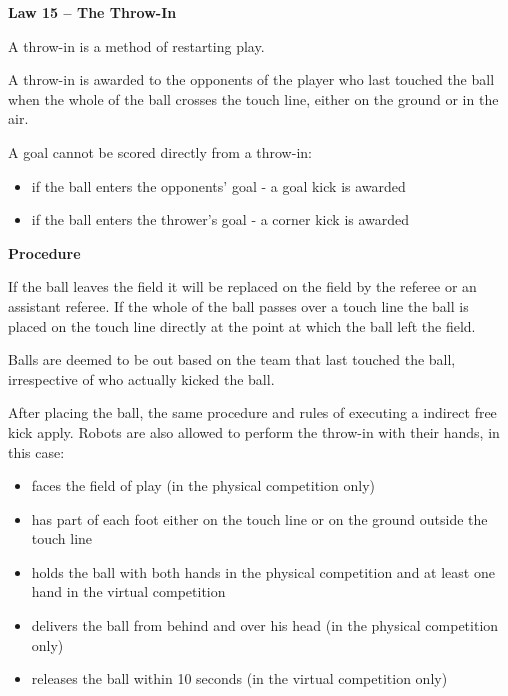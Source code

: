 \clearpage
\sffamily
{\bfseries
\textcolor[rgb]{0.4,0.4,0.4}{Law 15 -- The Throw-In} }
{}


\bigskip

A throw-in is a method of restarting play.

\bigskip

A throw-in is awarded to the opponents of the player who last touched the ball when the whole of the ball crosses the touch line, either on the ground or in the air.


\bigskip

A goal cannot be scored directly from a throw-in:
\begin{itemize}
\item if the ball enters the opponents' goal - a goal kick is awarded
\item if the ball enters the thrower's goal - a corner kick is awarded
\end{itemize}

\bigskip

{\bfseries Procedure }

\headlinebox 

If the ball leaves the field it will be replaced on the field by the referee or
an assistant referee.
If the whole of the ball passes over a touch line the ball is placed on the
touch line directly at the point at which the ball left the field.

\bigskip

Balls are deemed to be out based on the team that last touched the ball,
irrespective of who actually kicked the ball.

\bigskip

After placing the ball, the same procedure and rules of executing a indirect free kick apply.
Robots are also allowed to perform the throw-in with their hands, in this case:

\begin{itemize}
\item faces the field of play (in the physical competition only)
\item has part of each foot either on the touch line or on the ground outside
      the touch line
\item holds the ball with both hands in the physical competition and at least one hand in the virtual competition
\item delivers the ball from behind and over his head (in the physical competition only)

\item releases the ball within 10 seconds (in the virtual competition only)
\end{itemize}

